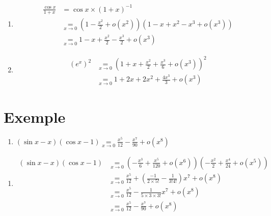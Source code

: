\documentclass[../main.tex]{subfiles}
\begin{document}
\begin{enumerate}
    \item \begin{align*}
        \frac{\cos x}{1 + x} &= \cos x \times (1 + x)^{-1} \\
        &\underset{x\to 0}{=} (1 - \frac{x^2}{2} + o(x^2))(1 - x + x^2 - x^3 + o(x^3)) \\
        &\underset{x\to 0}{=} 1 - x + \frac{x^2}{2} - \frac{x^3}{2} + o(x^3)
    \end{align*}

    \item \begin{align*}
        (e^x)^2 &\underset{x\to 0}{=} (1 + x + \frac{x^2}{2} + \frac{x^3}{6} + o(x^3))^2 \\
        &\underset{x\to 0}{=} 1 + 2x + 2x^2 + \frac{4x^3}{3} + o(x^3)
    \end{align*}
\end{enumerate}

\section{Exemple}
\begin{tcolorbox}[title=Exemple 25.58, title filled=false, colframe=darkgreen, colback=darkgreen!10!white]
    \begin{enumerate}
        \item $(\sin x - x)(\cos x - 1) \underset{x\to 0}{=} \frac{x^5}{12} - \frac{x^7}{90} + o(x^8)$
    \end{enumerate}
\end{tcolorbox}

\begin{enumerate}
    \item \begin{align*}
        (\sin x - x)(\cos x - 1) &\underset{x\to 0}{=} \left( -\frac{x^3}{6} + \frac{x^5}{120} + o(x^6) \right) \left( -\frac{x^2}{2} + \frac{x^4}{24} + o(x^5) \right) \\
        &\underset{x\to 0}{=} \frac{x^5}{12} + \left( \frac{-1}{2 \times 5!} - \frac{1}{3!4!} \right) x^7 + o(x^8) \\
        &\underset{x\to 0}{=} \frac{x^5}{12} - \frac{1}{5 \times 3 \times 3!} x^7 + o(x^8) \\
        &\underset{x\to 0}{=} \frac{x^5}{12} - \frac{x^7}{90} + o(x^8)
    \end{align*}
\end{enumerate}
\end{document}
